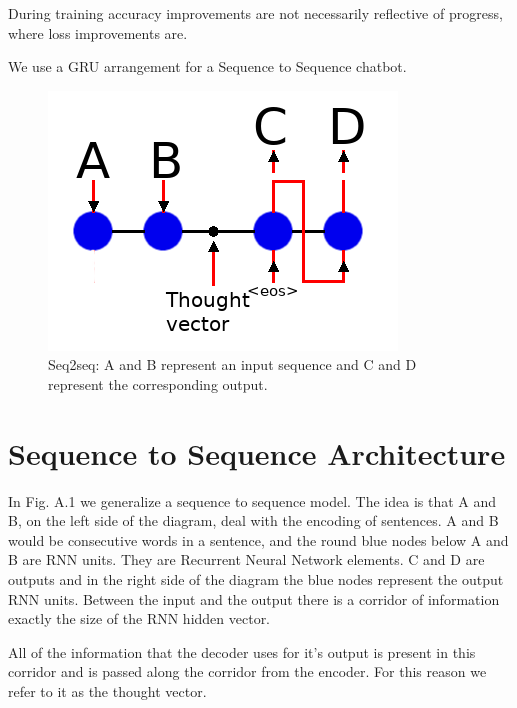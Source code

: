 During training accuracy improvements are not necessarily reflective of progress, where loss
improvements are.

We use a GRU arrangement for a Sequence to Sequence chatbot.


\begin{figure}[H]

\begin{center}

\includegraphics[scale=0.5]{diagram-nmt}

	
\end{center}

\caption[Sequnce to Sequence]{Seq2seq: A and B represent an input sequence and C and D represent the corresponding output.}

\end{figure}


\section{Sequence to Sequence Architecture}

In Fig. A.1 we generalize a sequence to sequence model. The idea is
that A and B, on the left side of the diagram, deal with the encoding
of sentences. A and B would be consecutive words in a sentence, and
the round blue nodes below A and B are RNN units. They are Recurrent
Neural Network elements. C and D are outputs and in the right side
of the diagram the blue nodes represent the output RNN units. Between
the input and the output there is a corridor of information exactly
the size of the RNN hidden vector. 

All of the information that the decoder uses for it\textquoteright s
output is present in this corridor and is passed along the corridor
from the encoder. For this reason we refer to it as the thought vector.

